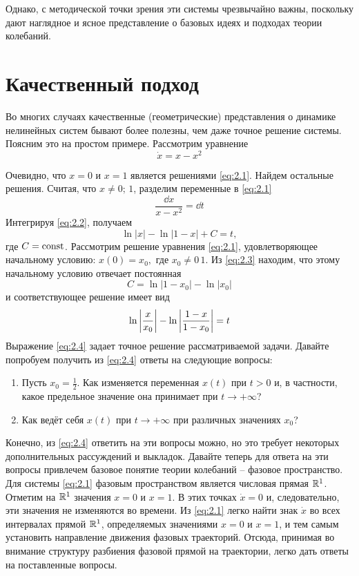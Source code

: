 	
Однако, с методической точки зрения эти системы чрезвычайно важны,
поскольку дают наглядное и ясное представление о базовых идеях и подходах
теории колебаний.
\section{Качественный подход} %
Во многих случаях качественные (геометрические) представления о
динамике нелинейных систем бывают более полезны, чем даже точное решение
системы. Поясним это на простом примере. Рассмотрим уравнение
\begin{equation}
	\label{eq:2.1}
	\dot x = x- x^2
\end{equation}

Очевидно, что $x=0$ и $x=1$ является решениями \eqref{eq:2.1}. Найдем остальные решения. Считая, что $x\neq 0;\,1$, разделим переменные в \eqref{eq:2.1}
\begin{equation}
	\label{eq:2.2}
	\frac{\dd{x}}{x-x^2}= \dd{t}
\end{equation}
Интегрируя \eqref{eq:2.2}, получаем 
\begin{equation}
	\label{eq:2.3}
	\ln|x| - \ln|1-x|+C=t,		
\end{equation}
где $C=\textrm{const}$. Рассмотрим решение уравнения \eqref{eq:2.1}, удовлетворяющее начальному условию: $x(0)=x_0,$ где $x_0\neq 0\,1$. Из \eqref{eq:2.3} находим, что этому начальному условию отвечает постоянная
\begin{equation}
	\label{eq:}
	C=\ln|1-x_0| - \ln|x_0|
\end{equation}
и соответствующее решение имеет вид
\begin{equation}
	\label{eq:2.4}
	\ln\abs{\frac{x}{x_0}} - \ln\abs{\frac{1-x}{1-x_0}}=t
\end{equation}
Выражение \eqref{eq:2.4} задает точное решение рассматриваемой задачи. Давайте попробуем получить из \eqref{eq:2.4} ответы на следующие вопросы:
\begin{enumerate}
	\item Пусть $x_0=\frac12$. Как изменяется переменная $x(t)$ при $t>0$ и, в частности, какое предельное значение она принимает при $t \rightarrow +\infty$?
	\item Как ведёт себя $x(t)$ при $t \rightarrow + \infty$ при различных значениях $x_0$?
\end{enumerate}

Конечно, из \eqref{eq:2.4} ответить на эти вопросы можно, но это требует некоторых дополнительных рассуждений и выкладок. Давайте теперь для ответа на эти вопросы привлечем базовое понятие теории колебаний -- фазовое пространство. Для системы \eqref{eq:2.1} фазовым пространством является числовая прямая $\mathbb{R}^1$. Отметим на $\mathbb{R}^1$ значения $x=0$ и $x=1$. В этих точках $\dot x=0$ и, следовательно, эти значения не изменяются во времени. Из \eqref{eq:2.1} легко найти знак $\dot x$ во всех интервалах прямой $\mathbb{R}^1$, определяемых значениями $x=0$ и $x=1$, и тем самым установить направление движения фазовых траекторий. Отсюда, принимая во внимание структуру разбиения фазовой прямой на траектории, легко дать ответы на поставленные вопросы.

